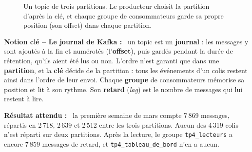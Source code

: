 \documentclass[11pt,a4paper]{article}
\newenvironment{resultat}{\par\medskip\noindent\textbf{Résultat attendu :}\ }{\par\medskip}
\newcommand{\cmd}[1]{\texttt{#1}}
\newenvironment{notion}[1][]{\par\medskip\noindent\textbf{\textcolor{lhblue}{Notion clé\if\relax\detokenize{#1}\relax\else{} -- #1\fi{} :}}\ }{\par\medskip}
\begin{document}
\begin{figure}[H]
\centering
{}
\caption{Un topic de trois partitions. Le producteur choisit la partition d'après la clé, et chaque
groupe de consommateurs garde sa propre position (son offset) dans chaque partition.}
\label{fig:kafka}
\end{figure}

\begin{notion}[Le journal de Kafka]
un topic est un \textbf{journal} : les messages y sont ajoutés à la
fin et numérotés (l'\textbf{offset}), puis gardés pendant la durée de rétention, qu'ils aient été
lus ou non. L'ordre n'est garanti que dans une \textbf{partition}, et la \textbf{clé} décide de la
partition : tous les événements d'un colis restent ainsi dans l'ordre de leur envoi. Chaque
\textbf{groupe} de consommateurs mémorise sa position et lit à son rythme. Son \textbf{retard}
(\emph{lag}) est le nombre de messages qui lui restent à lire.
\end{notion}

\begin{resultat}
la première semaine de mars compte 7\,869 messages, répartis en 2\,718, 2\,639 et 2\,512 entre les
trois partitions. Aucun des 4\,319 colis n'est réparti sur deux partitions. Après la lecture, le
groupe \cmd{tp4\_lecteurs} a encore 7\,859 messages de retard, et \cmd{tp4\_tableau\_de\_bord} n'en a
aucun.
\end{resultat}
\end{document}
